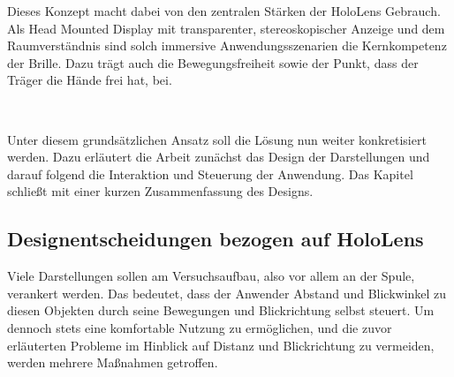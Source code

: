 Dieses Konzept macht dabei von den zentralen Stärken der HoloLens Gebrauch. Als Head Mounted Display mit transparenter, stereoskopischer Anzeige und dem Raumverständnis sind solch immersive Anwendungsszenarien die Kernkompetenz der Brille. Dazu trägt auch die Bewegungsfreiheit sowie der Punkt, dass der Träger die Hände frei hat, bei.

\vspace{8px}
\begin{center}
	\\
\end{center}
\vspace{6px}


Unter diesem grundsätzlichen Ansatz soll die Lösung nun weiter konkretisiert werden. Dazu erläutert die Arbeit zunächst das Design der Darstellungen und darauf folgend die Interaktion und Steuerung der Anwendung. Das Kapitel schließt mit einer kurzen Zusammenfassung des Designs.

\subsection{Designentscheidungen bezogen auf HoloLens}
\label{sec-4-2}
Viele Darstellungen sollen am Versuchsaufbau, also vor allem an der Spule, verankert werden. Das bedeutet, dass der Anwender Abstand und Blickwinkel zu diesen Objekten durch seine Bewegungen und Blickrichtung selbst steuert. Um dennoch stets eine komfortable Nutzung zu ermöglichen, und die zuvor erläuterten Probleme im Hinblick auf Distanz und Blickrichtung zu vermeiden, werden mehrere Maßnahmen getroffen.\\

